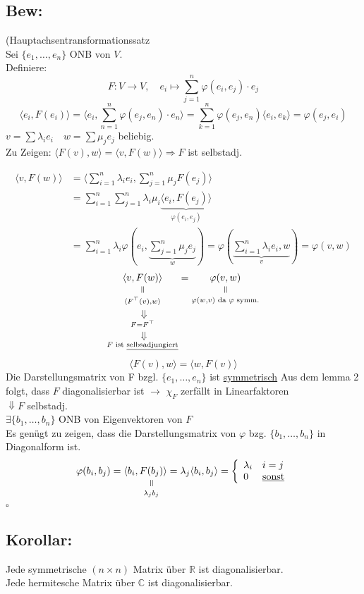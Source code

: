 \documentclass[titlepage,12pt,a4paper,ngerman]{report}
\newenvironment{bew}{\subsection{Bew:}}{\hfill$\square$}
\newcommand{\Bew}[1]{\begin{bew}#1\end{bew}}
\newcommand{\verteq}{\rotatebox{90}{$\,=$}}
\newcommand{\equalto}[2]{\underset{\scriptstyle\overset{\mkern4mu\verteq}{#2}}{#1}}
\newcommand{\custo}[3]{\underset{\scriptstyle\overset{\mkern4mu\rotatebox{-90}{$\,#1$}}{#3}}{#2}}
\newcommand{\tx}[1]{\textrm{#1}}
\newcommand{\ub}[1]{\underbrace{#1}}
\newcommand{\basis}[3]{\{#1_{#2}, \dots, #1_{#3}\}}
\newcommand{\summ}[2]{\sum_{#1}^{#2}}
\newcommand{\casess}[4]{\left\{ \begin{array}{ll} {#1} & {#2} \\ {#3} & {#4} \end{array} \right.}
\newcommand{\ska}[2]{\langle #1 , #2 \rangle}
\begin{document}
\Bew{(Hauptachsentransformationssatz\\
Sei $\basis{e}{1}{n}$ ONB von $V$.\\
Definiere: $$F:V \to V, \quad e_i \mapsto \summ{j = 1}{n} \varphi (e_i, e_j) \cdot e_j$$
$$\ska{e_i}{F(e_i)}= \ska{e_i}{\summ{n=1}{n} \varphi (e_j, e_n) \cdot e_n} = \summ{k=1}{n} \varphi ( e_j, e_n) \ska{e_i}{e_k} = \varphi (e_j,e_i)$$
$v = \sum \lambda_i e_i \quad w = \sum \mu_j e_j$ beliebig.\\
Zu Zeigen: $\ska{F(v)}{w}= \ska{v}{F(w)} \Rightarrow F$ ist selbstadj.

\begin{align*}
\ska{v}{F(w)} &= \ska{\sum_{i=1}^{n} \lambda_i e_i}{\sum_{j=1}^{n} \mu_j F(e_j)}\\
&= \sum_{i=1}^{n} \sum_{j=1}^{n} \lambda_i \mu_i \ub{\ska{e_i}{F(e_j)}}_{\varphi(e_i,e_j)}\\
&= \sum_{i=1}^{n} \lambda_i \varphi(e_i, \ub{\sum_{j=1}^{n} \mu_j e_j}_{w}) = \varphi(\ub{\sum_{i=1}^{n} \lambda_i e_i , w}_{v}) = \varphi(v,w)
\end{align*}
\begin{equation*}
\equalto{\ska{v}{F(w)}}{\custo{\Rightarrow}{\ska{F^\top(v)}{w}}{\custo{\Rightarrow}{F = F^\top}{F \tx{ ist \underline{selbsadjungiert}}}}} = \equalto{\varphi(v,w)}{\varphi(w,v) \tx{ da } \varphi \tx{ symm.}} 
\end{equation*}
\begin{equation*}
\ska{F(v)}{w} = \ska{w}{F(v)}
\end{equation*}
Die Darstellungsmatrix von F bzgl. $ \basis{e}{1}{n} $ ist \underline{symmetrisch}
Aus dem lemma 2 folgt, dass $F$ diagonalisierbar ist $\rightarrow$ $\chi_F$ zerfällt in Linearfaktoren\\ 
$\Downarrow F$ selbstadj.\\
$\exists \basis{b}{1}{n}$ ONB von Eigenvektoren von $F$\\
Es genügt zu zeigen, dass die Darstellungsmatrix von $\varphi$ bzg. $\basis{b}{1}{n}$ in Diagonalform ist.
$$\varphi(b_i, b_j) = \ska{b_i}{\equalto{F(b_j)}{\lambda_j b_j}} = \lambda_j\ska{b_i}{b_j} = \casess{\lambda_i}{i = j}{0}{\underline{\tx{sonst}}}$$
}

\subsection{Korollar:}
Jede symmetrische $ (n\times n) $ Matrix über $ \mathbb{R} $ ist diagonalisierbar.\\
Jede hermitesche Matrix über $ \mathbb{C} $ ist diagonalisierbar.
\end{document}

